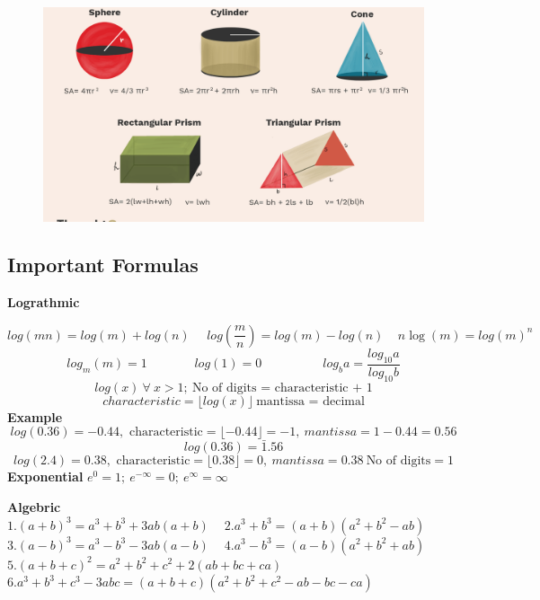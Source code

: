 \begin{figure}[h!]
    \centering
    \includegraphics[width=\linewidth]{images/volume-and-surface-area.png}
\end{figure}


\subsection{Important Formulas}
\textbf{Lograthmic}\\
\begin{fleqn}
\[log(mn)=log(m)+log(n) \ \ \ \ \ \ log\left(\frac{m}{n}\right)=log(m)-log(n) \ \ \ \ \ n\log(m)=log(m)^n \]
\[log_m(m)=1 \ \ \ \ \ \ \ \ \ \ \ \ \ \ \ \ \ log(1)=0\ \ \ \ \ \ \ \ \ \ \ \ \ \ \ \ \ \ \ \ \ \ log_ba=\frac{log_{10}a}{log_{10}b}\]
\[log(x) \ \forall \ x > 1; \ \text{No of digits = characteristic + 1}\]
\[characteristic = \lfloor log(x)\rfloor \ \text{mantissa = decimal} \]
\textbf{Example}
\[log(0.36)=-0.44,\text{ characteristic}=\lfloor-0.44\rfloor = -1, \ mantissa=1-0.44=0.56\]
\[log(0.36)=\bar{1}.56\]
\[log(2.4)=0.38,\text{ characteristic}=\lfloor0.38\rfloor = 0, \ mantissa=0.38\ \text{No of digits} = 1\]
\textbf{Exponential } \(e^0 = 1;\ e^{-\infty}=0;\ e^\infty=\infty\)\vspace{0.2cm}\\
\end{fleqn}
\textbf{Algebric}\\
\(1. (a+b)^3 = a^3 + b^3 + 3ab(a+b) \ \ \ \ \)
\(2. a^3+b^3=(a+b)(a^2+b^2-ab)\) \\
\(3. (a-b)^3 = a^3 - b^3 - 3ab(a-b) \ \ \ \ \)
\(4. a^3-b^3=(a-b)(a^2+b^2+ab)\) \\
\(5. (a+b+c)^2=a^2+b^2+c^2+2(ab+bc+ca)\) \\
\(6. a^3+b^3+c^3-3abc=(a+b+c)(a^2+b^2+c^2-ab-bc-ca)\) \\



